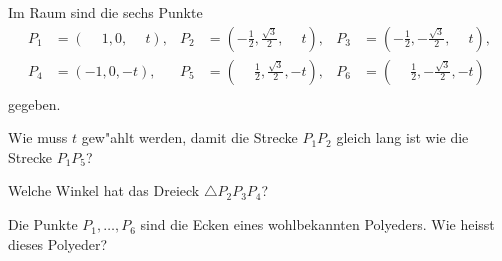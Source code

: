 Im Raum sind die sechs Punkte
\begin{align*}
P_1&=(\phantom{-}1,0,\phantom{-}t),&
	P_2&=(\textstyle-\frac12,\textstyle\frac{\sqrt{3}}2,\phantom{-}t),&
		P_3&=(\textstyle-\frac12,-\textstyle\frac{\sqrt{3}}2, \phantom{-}t),\\
P_4&=(-1,0,-t),&
	P_5&=(\textstyle\phantom{-}\frac12,\textstyle\frac{\sqrt{3}}2,-t),&
		P_6&=(\textstyle\phantom{-}\frac12,\textstyle-\frac{\sqrt{3}}2,-t)\\
\end{align*}
gegeben.
\begin{teilaufgaben}
\item
Wie muss $t$ gew"ahlt werden, damit die Strecke $P_1P_2$ gleich lang ist
wie die Strecke $P_1P_5$?
\item
Welche Winkel hat das Dreieck $\triangle P_2P_3P_4$?
\item
Die Punkte $P_1,\dots,P_6$ sind die Ecken eines wohlbekannten Polyeders.
Wie heisst dieses Polyeder?
\end{teilaufgaben}


